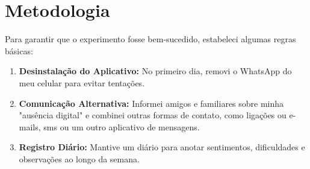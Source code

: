\chapter{Metodologia}\label{capitulo2}
Para garantir que o experimento fosse bem-sucedido, estabeleci algumas regras básicas:
\begin{enumerate}
	\item \textbf{Desinstalação do Aplicativo:} No primeiro dia, removi o WhatsApp do meu celular para evitar tentações.
	\item \textbf{Comunicação Alternativa:} Informei amigos e familiares sobre minha "ausência digital" e combinei outras formas de contato, como ligações ou e-mails, sms ou um outro aplicativo de mensagens.
	\item \textbf{Registro Diário:} Mantive um diário para anotar sentimentos, dificuldades e observações ao longo da semana.
\end{enumerate}